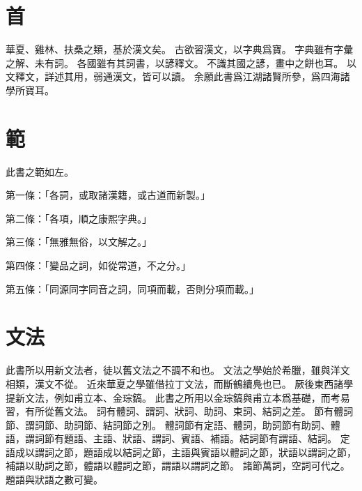 \section{首}
華夏、雞林、扶桑之類，基於漢文矣。
古欲習漢文，以字典爲寶。
字典雖有字彙之解、未有詞。
各國雖有其詞書，以諺釋文。
不識其國之諺，畫中之餅也耳。
以文釋文，詳述其用，弱通漢文，皆可以讀。
余願此書爲江湖諸賢所參，爲四海諸學所寶耳。
\section{範}
此書之範如左。
\par 第一條：「各詞，或取諸漢籍，或古道而新製。」
\par 第二條：「各項，順之康熙字典。」
\par 第三條：「無雅無俗，以文解之。」
\par 第四條：「變品之詞，如從常道，不之分。」
\par 第五條：「同源同字同音之詞，同項而載，否則分項而載。」
\section{文法}
此書所以用新文法者，徒以舊文法之不調不和也。
文法之學始於希臘，雖與洋文相類，漢文不從。
近來華夏之學雖借拉丁文法，而斷鶴續鳧也已。
厥後東西諸學提新文法，例如甫立本、金琮鎬。
此書之所用以金琮鎬與甫立本爲基礎，而考易習，有所從舊文法。
詞有體詞、謂詞、狀詞、助詞、束詞、結詞之差。
節有體詞節、謂詞節、助詞節、結詞節之別。
體詞節有定語、體詞，助詞節有助詞、體語，謂詞節有題語、主語、狀語、謂詞、賓語、補語。結詞節有謂語、結詞。
定語成以謂詞之節，題語成以結詞之節，主語與賓語以體詞之節，狀語以謂詞之節，補語以助詞之節，體語以體詞之節，謂語以謂詞之節。
諸節萬詞，空詞可代之。題語與狀語之數可變。
